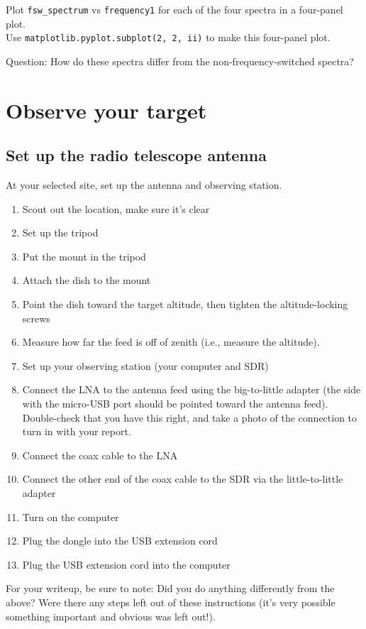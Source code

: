 \documentclass[11pt]{article}
\begin{document}
Plot \verb|fsw_spectrum| vs \verb|frequency1| for each of the four spectra in a four-panel plot. \\
Use \verb|matplotlib.pyplot.subplot(2, 2, ii)| to make this four-panel plot.

Question: How do these spectra differ from the non-frequency-switched spectra?


\clearpage
\section{Observe your target}
\label{sec:observe}
\subsection{Set up the radio telescope antenna}
At your selected site, set up the antenna and observing station.

\begin{enumerate}
    \item Scout out the location, make sure it's clear
    \item Set up the tripod
    \item Put the mount in the tripod
    \item Attach the dish to the mount
    \item Point the dish toward the target altitude, then tighten the altitude-locking screws
    \item Measure how far the feed is off of zenith (i.e., measure the altitude).
    \item Set up your observing station (your computer and SDR)
    \item Connect the LNA to the antenna feed using the big-to-little adapter
        (the side with the micro-USB port should be pointed toward the antenna
        feed).  Double-check that you have this right, and take a photo of the connection to turn in with your report.
    \item Connect the coax cable to the LNA
    \item Connect the other end of the coax cable to the SDR via the little-to-little adapter
    \item Turn on the computer
    \item Plug the dongle into the USB extension cord
    \item Plug the USB extension cord into the computer
\end{enumerate}

For your writeup, be sure to note: Did you do anything differently from the above?
Were there any steps left out of these instructions (it's very possible something important
and obvious was left out!).
\end{document}
